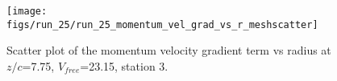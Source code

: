 \begin{figure}[H]
\centering
\texttt{[image: figs/run\_25/run\_25\_momentum\_vel\_grad\_vs\_r\_meshscatter]}
\caption{Scatter plot of the momentum velocity gradient term vs radius at $z/c$=7.75, $V_{free}$=23.15, station 3.}
\label{fig:run_25_momentum_vel_grad_vs_r_meshscatter}
\end{figure}


